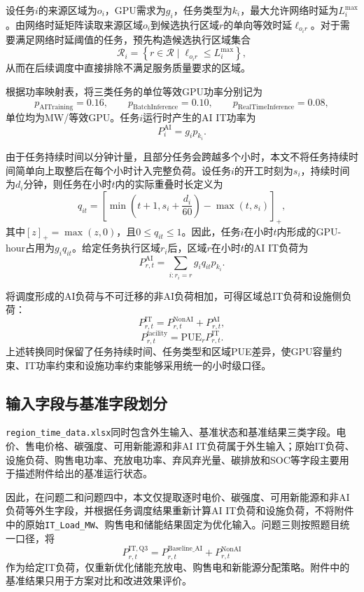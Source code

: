 \documentclass[UTF8,a4paper,zihao=-4]{ctexart}
\begin{document}
设任务$i$的来源区域为$o_i$，GPU需求为$g_i$，任务类型为$k_i$，最大允许网络时延为$L_i^{\max}$。由网络时延矩阵读取来源区域$o_i$到候选执行区域$r$的单向等效时延$\ell_{o_i r}$。对于需要满足网络时延阈值的任务，预先构造候选执行区域集合
\[
\mathcal{R}_i
=
\left\{
r\in\mathcal{R}\mid
\ell_{o_i r}\leq L_i^{\max}
\right\},
\]
从而在后续调度中直接排除不满足服务质量要求的区域。

根据功率映射表，将三类任务的单位等效GPU功率分别记为
\[
p_{\mathrm{AITraining}}=0.16,\qquad
p_{\mathrm{BatchInference}}=0.10,\qquad
p_{\mathrm{RealTimeInference}}=0.08,
\]
单位均为MW/等效GPU。任务$i$运行时产生的AI IT功率为
\[
P_i^{\mathrm{AI}}=g_i p_{k_i}.
\]

由于任务持续时间以分钟计量，且部分任务会跨越多个小时，本文不将任务持续时间简单向上取整后在每个小时计入完整负荷。设任务$i$的开工时刻为$s_i$，持续时间为$d_i$分钟，则任务在小时$t$内的实际重叠时长定义为
\[
q_{it}
=
\left[
\min\left(t+1,s_i+\frac{d_i}{60}\right)
-
\max(t,s_i)
\right]_{+},
\]
其中$[z]_{+}=\max(z,0)$，且$0\leq q_{it}\leq1$。因此，任务$i$在小时$t$内形成的GPU-hour占用为$g_iq_{it}$。给定任务执行区域$r_i$后，区域$r$在小时$t$的AI IT负荷为
\[
P_{r,t}^{\mathrm{AI}}
=
\sum_{i:r_i=r}
g_iq_{it}p_{k_i}.
\]

将调度形成的AI负荷与不可迁移的非AI负荷相加，可得区域总IT负荷和设施侧负荷：
\[
P_{r,t}^{\mathrm{IT}}
=
P_{r,t}^{\mathrm{NonAI}}
+
P_{r,t}^{\mathrm{AI}},
\]
\[
P_{r,t}^{\mathrm{facility}}
=
\mathrm{PUE}_{r}P_{r,t}^{\mathrm{IT}}.
\]
上述转换同时保留了任务持续时间、任务类型和区域PUE差异，使GPU容量约束、IT功率约束和设施功率约束能够采用统一的小时级口径。

\subsection{输入字段与基准字段划分}

\texttt{region\_time\_data.xlsx}同时包含外生输入、基准状态和基准结果三类字段。电价、售电价格、碳强度、可用新能源和非AI IT负荷属于外生输入；原始IT负荷、设施负荷、购售电功率、充放电功率、弃风弃光量、碳排放和SOC等字段主要用于描述附件给出的基准运行状态。

因此，在问题二和问题四中，本文仅提取逐时电价、碳强度、可用新能源和非AI负荷等外生字段，并根据任务调度结果重新计算AI IT负荷和设施负荷，不将附件中的原始\texttt{IT\_Load\_MW}、购售电和储能结果固定为优化输入。问题三则按照题目统一口径，将
\[
P_{r,t}^{\mathrm{IT,Q3}}
=
P_{r,t}^{\mathrm{Baseline\_AI}}
+
P_{r,t}^{\mathrm{NonAI}}
\]
作为给定IT负荷，仅重新优化储能充放电、购售电和新能源分配策略。附件中的基准结果只用于方案对比和改进效果评价。
\end{document}
